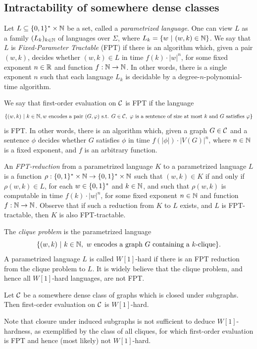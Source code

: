 \subsection{Intractability of somewhere dense classes}

Let $L\subseteq \{0,1\}^*\times \mathbb{N}$
be a set, called a \emph{parametrized language}. 
One can view $L$ as a family $(L_k)_{k\in\mathbb{N}}$ of languages over $\Sigma$, where $L_k=\{w\ |\ (w,k)\in\mathbb{N}\}$.
We say that $L$ is \emph{Fixed-Parameter Tractable} (FPT)
if there is an algorithm which, given a pair $(w,k)$,
decides whether $(w,k)\in L$ in time $f(k)\cdot |w|^n$,
for some fixed exponent $n\in\mathbb{R}$ and function $f:\mathbb{N}\to\mathbb{N}$.
In other words, there is a single exponent $n$ such that each language $L_k$ is decidable by a degree-$n$-polynomial-time algorithm.

We say that first-order evaluation on ${\cal C}$ is FPT if 
the language $$\{(w,k)\ |\ k\in\mathbb{N},
w\text{ encodes a pair $(G,\varphi)$ s.t. }
G\in {\cal C},\ \varphi\text{ is a sentence of size at most $k$ and $G$ satisfies $\varphi$}\}$$
is FPT. In other words,
there is an algorithm which, given a graph $G\in{\cal C}$
and a sentence $\phi$ decides whether $G$ satisfies $\phi$ in time $f(|\phi|)\cdot |V(G)|^n$, where $n\in\mathbb{N}$
is a fixed exponent, and $f$ is an arbitrary function.

An \emph{FPT-reduction} from a parametrized language $K$ to a parametrized language $L$ is a function $\rho:\{0,1\}^*\times\mathbb{N}\to\{0,1\}^*\times\mathbb{N}$
such that $(w,k)\in K$ if and only if $\rho(w,k)\in L$,
for each $w\in \{0,1\}^*$ and $k\in \mathbb{N}$, 
and such that $\rho(w,k)$ is computable in time 
$f(k)\cdot |w|^n$, for some fixed exponent $n\in\mathbb{N}$
and function $f:\mathbb{N}\to \mathbb{N}$. Observe that if such a reduction from $K$ to $L$ exists, and $L$ is FPT-tractable, then $K$
is also FPT-tractable.

The \emph{clique problem} is the parametrized language 
$$\{(w,k)\ |\ k\in\mathbb{N},\text{ $w$ encodes a graph $G$ containing a $k$-clique}\}.$$ A parametrized language $L$ is called $W[1]$-hard if there is an FPT reduction from the clique problem to $L$. It is widely believe that the clique problem, and hence all $W[1]$-hard languages, are not FPT.





\begin{proposition}
  Let ${\cal C}$ be a somewhere dense class of graphs which is closed under  subgraphs. Then first-order evaluation on ${\cal C}$ is $W[1]$-hard.
\end{proposition}
Note that  closure under induced subgraphs is not sufficient to deduce $W[1]$-hardness, as exemplified by the class of all cliques, for which first-order evaluation  is FPT and hence (most likely) not  $W[1]$-hard.

